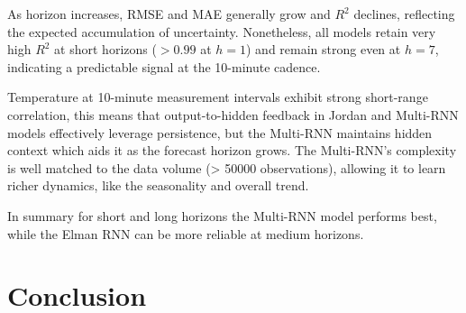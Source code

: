 \documentclass[conference]{IEEEtran}
\begin{document}
As horizon increases, RMSE and MAE generally grow and $R^2$ declines, reflecting the expected accumulation of uncertainty. Nonetheless, all models retain very high $R^2$ at short horizons ($>0.99$ at $h{=}1$) and remain strong even at $h{=}7$, indicating a predictable signal at the 10-minute cadence.

Temperature at 10-minute measurement intervals exhibit strong short-range correlation, this means that output-to-hidden feedback in Jordan and Multi-RNN models effectively leverage persistence, but the Multi-RNN maintains hidden context which aids it as the forecast horizon grows. The Multi-RNN's complexity is well matched to the data volume (> 50000 observations), allowing it to learn richer dynamics, like the seasonality and overall trend.

In summary for short and long horizons the Multi-RNN model performs best, while the Elman RNN can be more reliable at medium horizons.

\section{\textbf{Conclusion}}



\vspace{12pt}
\end{document}
